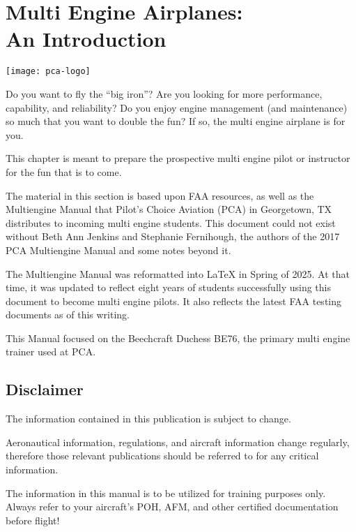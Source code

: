 \newcommand{\vyse}{\textcolor{blue}{$V_{yse}$ }}
\newcommand{\vmc}{\textcolor{red}{$V_{mc}$ }}
\newcommand{\vxse}{$V_{xse}$ }

\chapter*{Multi Engine Airplanes:\\An Introduction}

\begin{center}
\texttt{[image: pca-logo]}
\end{center}

Do you want to fly the ``big iron''? Are you looking for more performance, capability,
and reliability? Do you enjoy engine management (and maintenance) so much that you want to
double the fun? If so, the multi engine airplane is for you.

This chapter is meant to prepare the prospective multi engine pilot or instructor for the
fun that is to come.

The material in this section is based upon FAA resources, as well as the Multiengine Manual
that Pilot's Choice Aviation (PCA) in Georgetown, TX distributes to incoming multi engine students.
This document could not exist without Beth Ann Jenkins and Stephanie Fernihough, the authors of the
2017 PCA Multiengine Manual and some notes beyond it.

The Multiengine Manual was reformatted into \LaTeX{} in Spring of 2025. At that time, it was
updated to reflect eight years of students successfully using this document to become multi
engine pilots. It also reflects the latest FAA testing documents as of this writing.

This Manual focused on the Beechcraft Duchess BE76, the primary multi engine trainer used at PCA.

\section*{Disclaimer}

The information contained in this publication is subject to change.

Aeronautical information, regulations, and aircraft information change regularly, therefore those relevant
publications should be referred to for any critical information.

The information in this manual is to be utilized for training purposes only. Always
refer to your aircraft's POH, AFM, and other certified documentation before flight!


